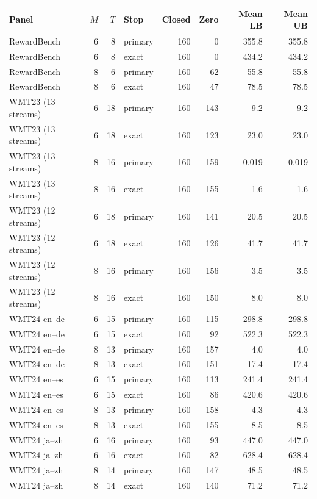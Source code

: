 \begin{table}[t]
\centering\small
\begin{tabular}{lrrlrrrr}
\toprule
Panel & $M$ & $T$ & Stop & Closed & Zero & Mean LB & Mean UB \\
\midrule
RewardBench & 6 & 8 & primary & 160 & 0 & 355.8 & 355.8 \\
RewardBench & 6 & 8 & exact & 160 & 0 & 434.2 & 434.2 \\
RewardBench & 8 & 6 & primary & 160 & 62 & 55.8 & 55.8 \\
RewardBench & 8 & 6 & exact & 160 & 47 & 78.5 & 78.5 \\
WMT23 (13 streams) & 6 & 18 & primary & 160 & 143 & 9.2 & 9.2 \\
WMT23 (13 streams) & 6 & 18 & exact & 160 & 123 & 23.0 & 23.0 \\
WMT23 (13 streams) & 8 & 16 & primary & 160 & 159 & 0.019 & 0.019 \\
WMT23 (13 streams) & 8 & 16 & exact & 160 & 155 & 1.6 & 1.6 \\
WMT23 (12 streams) & 6 & 18 & primary & 160 & 141 & 20.5 & 20.5 \\
WMT23 (12 streams) & 6 & 18 & exact & 160 & 126 & 41.7 & 41.7 \\
WMT23 (12 streams) & 8 & 16 & primary & 160 & 156 & 3.5 & 3.5 \\
WMT23 (12 streams) & 8 & 16 & exact & 160 & 150 & 8.0 & 8.0 \\
WMT24 en--de & 6 & 15 & primary & 160 & 115 & 298.8 & 298.8 \\
WMT24 en--de & 6 & 15 & exact & 160 & 92 & 522.3 & 522.3 \\
WMT24 en--de & 8 & 13 & primary & 160 & 157 & 4.0 & 4.0 \\
WMT24 en--de & 8 & 13 & exact & 160 & 151 & 17.4 & 17.4 \\
WMT24 en--es & 6 & 15 & primary & 160 & 113 & 241.4 & 241.4 \\
WMT24 en--es & 6 & 15 & exact & 160 & 86 & 420.6 & 420.6 \\
WMT24 en--es & 8 & 13 & primary & 160 & 158 & 4.3 & 4.3 \\
WMT24 en--es & 8 & 13 & exact & 160 & 155 & 8.5 & 8.5 \\
WMT24 ja--zh & 6 & 16 & primary & 160 & 93 & 447.0 & 447.0 \\
WMT24 ja--zh & 6 & 16 & exact & 160 & 82 & 628.4 & 628.4 \\
WMT24 ja--zh & 8 & 14 & primary & 160 & 147 & 48.5 & 48.5 \\
WMT24 ja--zh & 8 & 14 & exact & 160 & 140 & 71.2 & 71.2 \\

\end{tabular}
\end{table}
